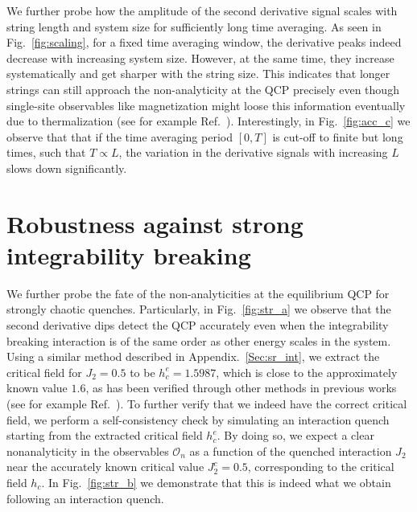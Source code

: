 \documentclass[aps,prx,twocolumn]{revtex4-2}
\begin{document}
{{ {We further probe how the amplitude of the second derivative signal scales with string length and system size for sufficiently long time averaging. As seen in Fig.~\ref{fig:scaling}, for a fixed time averaging window, the derivative peaks indeed decrease with increasing system size. However, at the same time, they increase systematically and get sharper with the string size. This indicates that longer strings can still approach the non-analyticity at the QCP precisely even though single-site observables like magnetization might loose this information eventually due to thermalization (see for example Ref.~\cite{suchsland22}). Interestingly, in Fig.~\ref{fig:acc_c} we observe that that if the time averaging period $[0,T]$ is cut-off to finite but long times, such that $T\propto L$, the variation in the derivative signals with increasing $L$ slows down significantly.}






\section{Robustness against strong integrability breaking}
\label{Sec:acc}

 {We further probe the fate of the non-analyticities at the equilibrium QCP for strongly chaotic quenches. Particularly, in Fig.~\ref{fig:str_a} we observe that the second derivative dips detect the QCP accurately even when the integrability breaking interaction is of the same order as other energy scales in the system. Using a similar method described in Appendix.~\ref{Sec:sr_int}, we extract the critical field for $J_2=0.5$ to be $h_c^e=1.5987$, which is close to the approximately known value $1.6$, as has been verified through other methods in previous works (see for example Ref.~\cite{heyl18}). To further verify that we indeed have the correct critical field, we perform a self-consistency check by simulating an interaction quench starting from the extracted critical field $h_c^e$. By doing so, we expect a clear nonanalyticity in the observables $\mathcal{O}_n$ as a function of the quenched interaction $J_2$ near the accurately known critical value $J_2^c=0.5$, corresponding to the critical field $h_c$. In Fig.~\ref{fig:str_b} we demonstrate that this is indeed what we obtain following an interaction quench.}\\

}}
\end{document}
